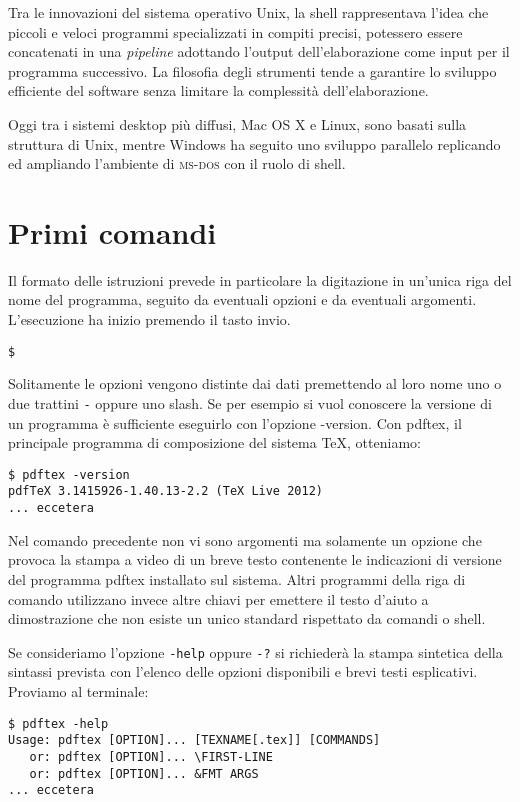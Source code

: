 Tra le innovazioni del sistema operativo Unix, la shell rappresentava l'idea che
piccoli e veloci programmi specializzati in compiti precisi, potessero essere
concatenati in una \emph{pipeline} adottando l'output dell'elaborazione come
input per il programma successivo. La filosofia degli strumenti tende a
garantire lo sviluppo efficiente del software senza limitare la complessità
dell'elaborazione.

Oggi tra i sistemi desktop più diffusi, Mac OS X e Linux, sono basati sulla
struttura di Unix, mentre Windows ha seguito uno sviluppo parallelo replicando
ed ampliando l'ambiente di \textsc{ms-dos} con il ruolo di shell.



\section{Primi comandi}

Il formato delle istruzioni prevede in particolare la digitazione in un'unica
riga del nome del programma, seguito da eventuali opzioni e da eventuali
argomenti. L'esecuzione ha inizio premendo il tasto invio.
\medskip

\texttt{\$   }
\medskip

Solitamente le opzioni vengono distinte dai dati premettendo al loro nome uno o
due trattini \texttt{-} oppure uno slash. Se per esempio si vuol conoscere la
versione di un programma è sufficiente eseguirlo con l'opzione
\textsf{-version}. Con \textsf{pdftex}, il principale programma di composizione
del sistema \TeX{}, otteniamo:
\begin{verbatim}
$ pdftex -version
pdfTeX 3.1415926-1.40.13-2.2 (TeX Live 2012)
... eccetera
\end{verbatim}

Nel comando precedente non vi sono argomenti ma solamente un opzione che provoca
la stampa a video di un breve testo contenente le indicazioni di versione del
programma \textsf{pdftex} installato sul sistema. Altri programmi della riga di
comando utilizzano invece altre chiavi per emettere il testo d'aiuto a
dimostrazione che non esiste un unico standard rispettato da comandi o shell.

Se consideriamo l'opzione \texttt{-help} oppure \texttt{-?} si richiederà la
stampa sintetica della sintassi prevista con l'elenco delle opzioni disponibili
e brevi testi esplicativi. Proviamo al terminale:
\begin{verbatim}
$ pdftex -help
Usage: pdftex [OPTION]... [TEXNAME[.tex]] [COMMANDS]
   or: pdftex [OPTION]... \FIRST-LINE
   or: pdftex [OPTION]... &FMT ARGS
... eccetera
\end{verbatim}

